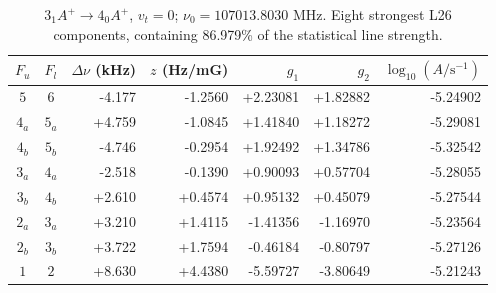\begin{table}[!htbp]
\centering\small\renewcommand{\arraystretch}{1.1}\setlength{\tabcolsep}{5pt}
\caption{$3_{1} A^{+}\rightarrow 4_{0} A^{+}$, $v_t=0$; $\nu_0=107013.8030$ MHz. Eight strongest L26 components, containing 86.979\% of the statistical line strength.}
\label{tab:sm-zeeman-107}
\begin{tabular}{ccrrrrr}
\hline\hline
$F_u$ & $F_l$ & $\Delta\nu$ (kHz) & $z$ (Hz/mG) & $g_1$ & $g_2$ & $\log_{10}(A/\mathrm{s}^{-1})$ \\
\hline
$5$ & $6$ & -4.177 & -1.2560 & +2.23081 & +1.82882 & -5.24902\\
$4_{a}$ & $5_{a}$ & +4.759 & -1.0845 & +1.41840 & +1.18272 & -5.29081\\
$4_{b}$ & $5_{b}$ & -4.746 & -0.2954 & +1.92492 & +1.34786 & -5.32542\\
$3_{a}$ & $4_{a}$ & -2.518 & -0.1390 & +0.90093 & +0.57704 & -5.28055\\
$3_{b}$ & $4_{b}$ & +2.610 & +0.4574 & +0.95132 & +0.45079 & -5.27544\\
$2_{a}$ & $3_{a}$ & +3.210 & +1.4115 & -1.41356 & -1.16970 & -5.23564\\
$2_{b}$ & $3_{b}$ & +3.722 & +1.7594 & -0.46184 & -0.80797 & -5.27126\\
$1$ & $2$ & +8.630 & +4.4380 & -5.59727 & -3.80649 & -5.21243\\
\hline\end{tabular}
\end{table}
